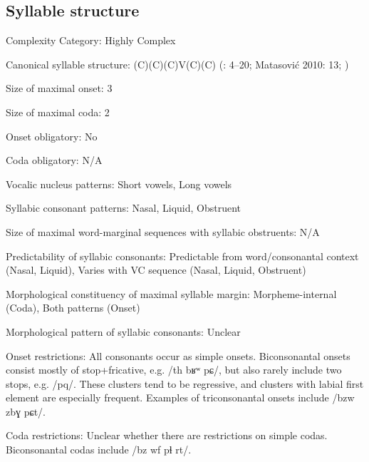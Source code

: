 {\subsection*{Syllable structure}
\begin{appendixdesc}

\item[Complexity Category:] Highly Complex

\item[Canonical syllable structure:] (C)(C)(C)V(C)(C) (\citealt{Colarusso2006}: 4--20; Matasović 2010: 13; \citealt{Applebaum2013})

\item[Size of maximal onset:] 3

\item[Size of maximal coda:] 2

\item[Onset obligatory:] No

\item[Coda obligatory:] N/A

\item[Vocalic nucleus patterns:] Short vowels, Long vowels

\item[Syllabic consonant patterns:] Nasal, Liquid, Obstruent

\item[Size of maximal word-marginal sequences with syllabic obstruents:] N/A

\item[Predictability of syllabic consonants:] Predictable from word/consonantal context (Nasal, Liquid), Varies with VC sequence (Nasal, Liquid, Obstruent)

\item[Morphological constituency of maximal syllable margin:] Morpheme-internal (Coda), Both patterns (Onset)

\item[Morphological pattern of syllabic consonants:] Unclear

\item[Onset restrictions:] All consonants occur as simple onsets. Biconsonantal onsets consist mostly of stop+fricative, e.g. /th bʁʷ pɕ/, but also rarely include two stops, e.g. /pq/. These clusters tend to be regressive, and clusters with labial first element are especially frequent. Examples of triconsonantal onsets include /bzw zbɣ pɕt/.

\item[Coda restrictions:] Unclear whether there are restrictions on simple codas. Biconsonantal codas include /bz wf pɬ rt/.


\end{appendixdesc}}
